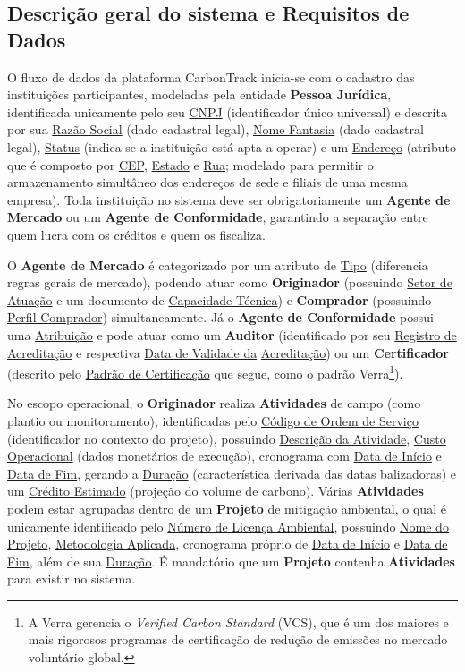 \documentclass[12pt]{article}
\begin{document}
\subsection{Descrição geral do sistema e Requisitos de Dados}
O fluxo de dados da plataforma CarbonTrack inicia-se com o cadastro das instituições participantes, modeladas pela entidade \textbf{Pessoa Jurídica}, identificada unicamente pelo seu \underline{CNPJ} (identificador único universal) e descrita por sua \underline{Razão Social} (dado cadastral legal), \underline{Nome Fantasia} (dado cadastral legal), \underline{Status} (indica se a instituição está apta a operar) e um \underline{Endereço} (atributo que é composto por \underline{CEP}, \underline{Estado} e \underline{Rua}; modelado para permitir o armazenamento simultâneo dos endereços de sede e filiais de uma mesma empresa). Toda instituição no sistema deve ser obrigatoriamente um \textbf{Agente de Mercado} ou um \textbf{Agente de Conformidade}, garantindo a separação entre quem lucra com os créditos e quem os fiscaliza.

O \textbf{Agente de Mercado} é categorizado por um atributo de \underline{Tipo} (diferencia regras gerais de mercado), podendo atuar como \textbf{Originador} (possuindo \underline{Setor de Atuação} e um documento de \underline{Capacidade Técnica}) e \textbf{Comprador} (possuindo \underline{Perfil Comprador}) simultaneamente. Já o \textbf{Agente de Conformidade} possui uma \underline{Atribuição} e pode atuar como um \textbf{Auditor} (identificado por seu \underline{Registro de Acreditação} e respectiva \underline{Data de Validade da} \underline{Acreditação}) ou um \textbf{Certificador} (descrito pelo \underline{Padrão de Certificação} que segue, como o padrão Verra\footnote{A Verra gerencia o \textit{Verified Carbon Standard} (VCS), que é um dos maiores e mais rigorosos programas de certificação de redução de emissões no mercado voluntário global.}).

No escopo operacional, o \textbf{Originador} realiza \textbf{Atividades} de campo (como plantio ou monitoramento), identificadas pelo \underline{Código de Ordem de Serviço} (identificador no contexto do projeto), possuindo \underline{Descrição da Atividade}, \underline{Custo Operacional} (dados monetários de execução), cronograma com \underline{Data de Início} e \underline{Data de Fim}, gerando a \underline{Duração} (característica derivada das datas balizadoras) e um \underline{Crédito Estimado} (projeção do volume de carbono). Várias \textbf{Atividades} podem estar agrupadas dentro de um \textbf{Projeto} de mitigação ambiental, o qual é unicamente identificado pelo \underline{Número de Licença Ambiental}, possuindo \underline{Nome do Projeto}, \underline{Metodologia Aplicada}, cronograma próprio de \underline{Data de Início} e \underline{Data de Fim}, além de sua \underline{Duração}. É mandatório que um \textbf{Projeto} contenha \textbf{Atividades} para existir no sistema.
\end{document}
